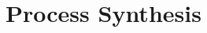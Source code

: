 \chapter{Process Synthesis}
\label{sec:synthesis}

\begin{refsection}








\clearpage
\printbibliography[heading=subbibintoc]



\begin{subappendices}
  
\end{subappendices}

\end{refsection}